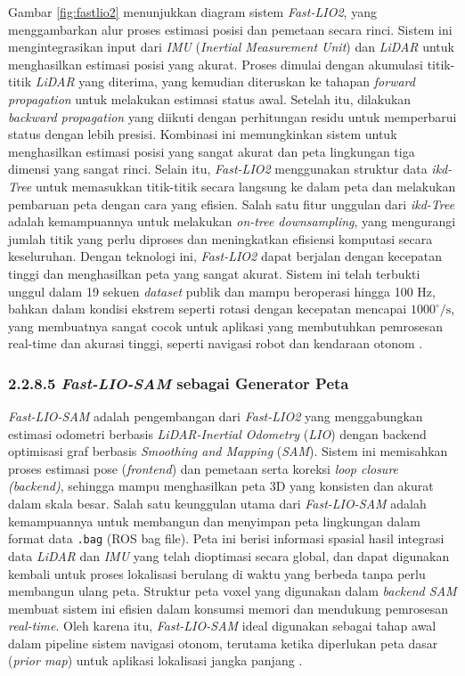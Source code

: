 Gambar \ref{fig:fastlio2} menunjukkan diagram sistem \emph{Fast-LIO2}, yang menggambarkan alur proses estimasi posisi dan pemetaan secara rinci. Sistem ini mengintegrasikan input dari \emph{IMU} (\emph{Inertial Measurement Unit}) dan \emph{LiDAR} untuk menghasilkan estimasi posisi yang akurat. Proses dimulai dengan akumulasi titik-titik \emph{LiDAR} yang diterima, yang kemudian diteruskan ke tahapan \emph{forward propagation} untuk melakukan estimasi status awal. Setelah itu, dilakukan \emph{backward propagation} yang diikuti dengan perhitungan residu untuk memperbarui status dengan lebih presisi. Kombinasi ini memungkinkan sistem untuk menghasilkan estimasi posisi yang sangat akurat dan peta lingkungan tiga dimensi yang sangat rinci. Selain itu, \emph{Fast-LIO2} menggunakan struktur data \emph{ikd-Tree} untuk memasukkan titik-titik secara langsung ke dalam peta dan melakukan pembaruan peta dengan cara yang efisien. Salah satu fitur unggulan dari \emph{ikd-Tree} adalah kemampuannya untuk melakukan \emph{on-tree downsampling}, yang mengurangi jumlah titik yang perlu diproses dan meningkatkan efisiensi komputasi secara keseluruhan. Dengan teknologi ini, \emph{Fast-LIO2} dapat berjalan dengan kecepatan tinggi dan menghasilkan peta yang sangat akurat. Sistem ini telah terbukti unggul dalam 19 sekuen \emph{dataset} publik dan mampu beroperasi hingga 100 Hz, bahkan dalam kondisi ekstrem seperti rotasi dengan kecepatan mencapai $1000^\circ/\text{s}$, yang membuatnya sangat cocok untuk aplikasi yang membutuhkan pemrosesan real-time dan akurasi tinggi, seperti navigasi robot dan kendaraan otonom \cite{xu2022fastlio}.




\subsubsection{2.2.8.5 \emph{Fast-LIO-SAM} sebagai Generator Peta}

\emph{Fast-LIO-SAM} adalah pengembangan dari \emph{Fast-LIO2} yang menggabungkan estimasi odometri berbasis \emph{LiDAR-Inertial Odometry} (\emph{LIO}) dengan backend optimisasi graf berbasis \emph{Smoothing and Mapping} (\emph{SAM}). Sistem ini memisahkan proses estimasi pose (\emph{frontend}) dan pemetaan serta koreksi \emph{loop closure (backend)}, sehingga mampu menghasilkan peta 3D yang konsisten dan akurat dalam skala besar. Salah satu keunggulan utama dari \emph{Fast-LIO-SAM} adalah kemampuannya untuk membangun dan menyimpan peta lingkungan dalam format data \texttt{.bag} (ROS bag file). Peta ini berisi informasi spasial hasil integrasi data \emph{LiDAR} dan \emph{IMU} yang telah dioptimasi secara global, dan dapat digunakan kembali untuk proses lokalisasi berulang di waktu yang berbeda tanpa perlu membangun ulang peta. Struktur peta voxel yang digunakan dalam \emph{backend SAM} membuat sistem ini efisien dalam konsumsi memori dan mendukung pemrosesan \emph{real-time}. Oleh karena itu, \emph{Fast-LIO-SAM} ideal digunakan sebagai tahap awal dalam pipeline sistem navigasi otonom, terutama ketika diperlukan peta dasar (\emph{prior map}) untuk aplikasi lokalisasi jangka panjang \cite{xu2022fastlio}.

